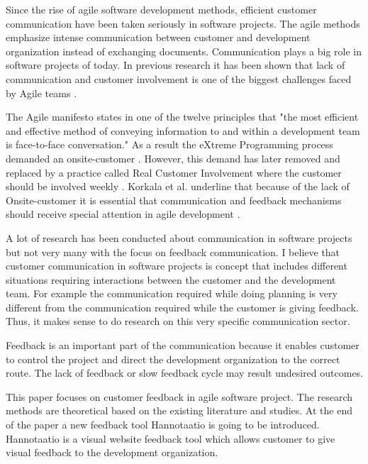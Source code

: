\documentclass[conference]{IEEEtran}
\begin{document}


 

Since the rise of agile software development methods, efficient customer communication have been taken seriously in software projects. The agile methods emphasize intense communication between customer and development organization instead of exchanging documents. Communication plays a big role in software projects of today. In previous research it has been shown that lack of communication and customer involvement is one of the biggest challenges faced by Agile teams \cite{2010hoda}. 

The Agile manifesto states in one of the twelve principles that "the most efficient and effective method of conveying information to and within a development team is face-to-face conversation." \cite{agilemanifesto} As a result the eXtreme Programming process demanded an onsite-customer \cite{2002wake}. However, this demand has later removed and replaced by a practice called Real Customer Involvement where the customer should be involved weekly \cite{2006korkala}.  Korkala et al. underline that because of the lack of Onsite-customer it is essential that communication and feedback mechanisms should receive special attention in agile development \cite{2006korkala}.

A lot of research has been conducted about communication in software projects but not very many with the focus on feedback communication. I believe that customer communication in software projects is concept that includes different situations requiring interactions between the customer and the development team. For example the communication required while doing planning is very different from the communication required while the customer is giving feedback. Thus, it makes sense to do research on this very specific communication sector.

Feedback is an important part of the communication because it enables customer to control the project and direct the development organization to the correct route. The lack of feedback or slow feedback cycle may result undesired outcomes.

This paper focuses on customer feedback in agile software project. The research methods are theoretical based on the existing literature and studies. At the end of the paper a new feedback tool Hannotaatio is going to be introduced. Hannotaatio is a visual website feedback tool which allows customer to give visual feedback to the development organization.
\end{document}

